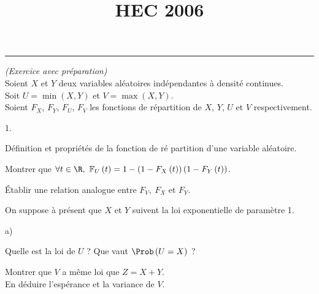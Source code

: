 \documentclass[11pt]{article}%
\title{\bf \vspace{-1.6cm} HEC 2006} %
\author{} %
\date{} %
\begin{document}
\maketitle %
\vspace{-1.2cm}\hrule %
\thispagestyle{fancy}

\vspace*{.2cm}


\begin{exercice}{\it (Exercice avec préparation)}~\\
  Soient $X$ et $Y$ deux variables aléatoires indépendantes à
  densité continues.\\
  Soit $U=\min \left( X,Y\right) $ et $V=\max \left( X,Y\right)$.\\
  Soient $F_{X}$, $F_{Y}$, $F_{U}$, $F_{V}$ les fonctions de répartition
  de $X$, $Y$, $U$ et $V$ respectivement.

  \begin{noliste}{1.}
  \item Définition et propriétés de la fonction de ré%
    partition d'une variable aléatoire.

  \item Montrer que $\forall t\in \R,\mathbb{\ F}_{U}\left( t\right)
    =1-\left( 1-F_{X}\left( t\right) \right) \left( 1-F_{Y}\left( t\right)
    \right) $.

  \item Établir une relation analogue entre $F_{V},\ F_{X}$ et
    $F_{Y}$.

  \item On suppose à présent que $X$ et $Y$ suivent la loi
    exponentielle de paramètre 1.

    \begin{noliste}{a)}
    \item Quelle est la loi de $U$ ? Que vaut $\Prob\left( U=X\right) $ ?

    \item Montrer que $V$ a même loi que $Z=X+Y$. \\
      En déduire l'espérance et la variance de $V$.
    \end{noliste}
  \end{noliste}



\end{exercice}
\end{document}
